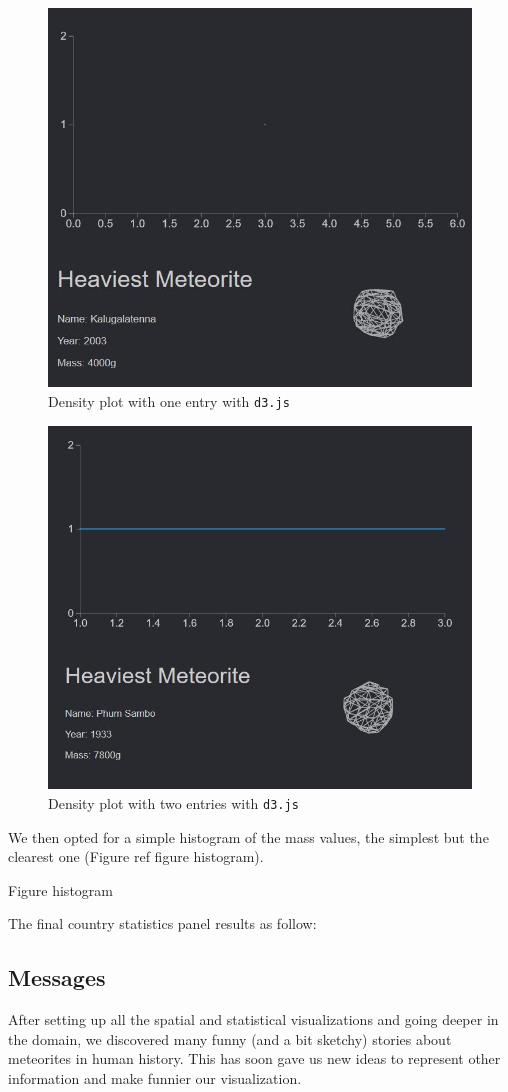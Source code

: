 \documentclass[10pt,conference,compsocconf]{IEEEtran}
\begin{document}
\begin{figure}[]
  \centering
  \includegraphics[width=.5\columnwidth]{images/one_point_density_plot}
  \caption{Density plot with one entry with \texttt{d3.js}}
  \label{fig:density_one}
\end{figure}

\begin{figure}[]
  \centering
  \includegraphics[width=.5\columnwidth]{images/two_point_density_plot}
  \caption{Density plot with two entries with \texttt{d3.js}}
  \label{fig:density_two}
\end{figure}

We then opted for a simple histogram of the mass values, the simplest but the clearest one (Figure ref figure histogram). 


Figure histogram %



The final country statistics panel results as follow: 




\subsection{Messages}
After setting up all the spatial and statistical visualizations and going deeper in the domain, we discovered many funny (and a bit sketchy) stories about meteorites in human history. This has soon gave us new ideas to represent other information and make funnier our visualization. 
\end{document}

